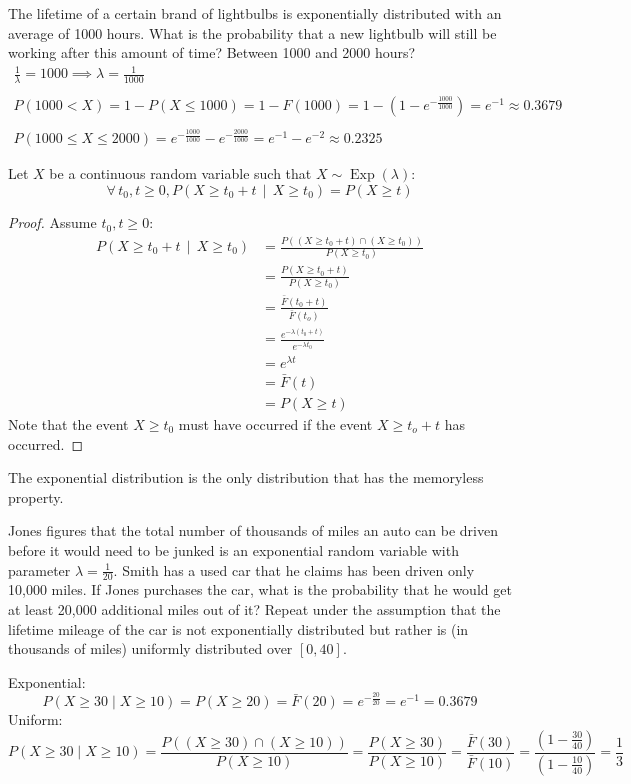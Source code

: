 \documentclass[letterpaper,12pt,fleqn]{article}
\DeclareMathOperator{\expd}{Exp}
\renewcommand{\l}{\lambda}
\begin{document}
\begin{example}
  The lifetime of a certain brand of lightbulbs is exponentially distributed with an average of 1000 hours.  What is
  the probability that a new lightbulb will still be working after this amount of time?  Between 1000 and 2000 hours?
  \begin{gather*}
    \frac{1}{\l}=1000\implies\l=\frac{1}{1000} \\
    \\
    P(1000<X)=1-P(X\le1000)=1-F(1000)=1-\left(1-e^{-\frac{1000}{1000}}\right)=e^{-1}\approx0.3679 \\
    \\
    P(1000\le X\le2000)=e^{-\frac{1000}{1000}}-e^{-\frac{2000}{1000}}=e^{-1}-e^{-2}\approx0.2325
  \end{gather*}
\end{example}

\begin{theorem}
  Let \(X\) be a continuous random variable such that \(X\sim\expd(\l)\):
  \[\forall\,t_0,t\ge0,P\left(X\ge t_0+t\,\middle|\,X\ge t_0\right)=P(X\ge t)\]
\end{theorem}

\begin{proof}
  Assume \(t_0,t\ge0\):
  \begin{align*}
    P\left(X\ge t_0+t\,\middle|\,X\ge t_0\right) &= \frac{P((X\ge t_0+t)\cap(X\ge t_0))}{P(X\ge t_0)} \\
    &= \frac{P(X\ge t_0+t)}{P(X\ge t_0)} \\
    &= \frac{\bar{F}(t_0+t)}{\bar{F}(t_o)} \\
    &= \frac{e^{-\l(t_0+t)}}{e^{-\l t_0}} \\
    &= e^{\l t} \\
    &= \bar{F}(t) \\
    &= P(X\ge t)
  \end{align*}
  Note that the event \(X\ge t_0\) must have occurred if the event \(X\ge t_o+t\) has occurred.
\end{proof}
The exponential distribution is the only distribution that has the memoryless property.

\begin{example}
  Jones figures that the total number of thousands of miles an auto can be driven before it would need to be junked is an
  exponential random variable with parameter \(\l=\frac{1}{20}\).  Smith has a used car that he claims has been driven only
  10,000 miles.  If Jones purchases the car, what is the probability that he would get at least 20,000 additional miles out
  of it?  Repeat under the assumption that the lifetime mileage of the car is not exponentially distributed but rather is
  (in thousands of miles) uniformly distributed over \([0,40]\).

  Exponential:
  \[P\left(X\ge30\middle|X\ge10\right)=P(X\ge20)=\bar{F}(20)=e^{-\frac{20}{20}}=e^{-1}=0.3679\]
  Uniform:
  \[P\left(X\ge30\middle|X\ge10\right)=\frac{P((X\ge30)\cap(X\ge10))}{P(X\ge10)}=\frac{P(X\ge30)}{P(X\ge10)}=
  \frac{\bar{F}(30)}{\bar{F}(10)}=\frac{\left(1-\frac{30}{40}\right)}{\left(1-\frac{10}{40}\right)}=\frac{1}{3}\]
\end{example}
\end{document}
